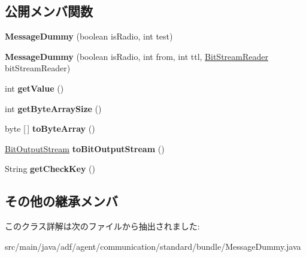 \subsection*{公開メンバ関数}
\begin{DoxyCompactItemize}
\item 
\hypertarget{classadf_1_1agent_1_1communication_1_1standard_1_1bundle_1_1MessageDummy_ab3ceef3eb4b3311da20d4b4310eb0795}{}\label{classadf_1_1agent_1_1communication_1_1standard_1_1bundle_1_1MessageDummy_ab3ceef3eb4b3311da20d4b4310eb0795} 
{\bfseries Message\+Dummy} (boolean is\+Radio, int test)
\item 
\hypertarget{classadf_1_1agent_1_1communication_1_1standard_1_1bundle_1_1MessageDummy_afdcdaae1ecf091988bd49f9b99570193}{}\label{classadf_1_1agent_1_1communication_1_1standard_1_1bundle_1_1MessageDummy_afdcdaae1ecf091988bd49f9b99570193} 
{\bfseries Message\+Dummy} (boolean is\+Radio, int from, int ttl, \hyperlink{classadf_1_1component_1_1communication_1_1util_1_1BitStreamReader}{Bit\+Stream\+Reader} bit\+Stream\+Reader)
\item 
\hypertarget{classadf_1_1agent_1_1communication_1_1standard_1_1bundle_1_1MessageDummy_a3b3a83172ac728d572969e0f8112d1ce}{}\label{classadf_1_1agent_1_1communication_1_1standard_1_1bundle_1_1MessageDummy_a3b3a83172ac728d572969e0f8112d1ce} 
int {\bfseries get\+Value} ()
\item 
\hypertarget{classadf_1_1agent_1_1communication_1_1standard_1_1bundle_1_1MessageDummy_a935b8e5e053be0d5f00a31b3d8fd97c6}{}\label{classadf_1_1agent_1_1communication_1_1standard_1_1bundle_1_1MessageDummy_a935b8e5e053be0d5f00a31b3d8fd97c6} 
int {\bfseries get\+Byte\+Array\+Size} ()
\item 
\hypertarget{classadf_1_1agent_1_1communication_1_1standard_1_1bundle_1_1MessageDummy_a5c1cdb219eeabf93a2f8e6678c845006}{}\label{classadf_1_1agent_1_1communication_1_1standard_1_1bundle_1_1MessageDummy_a5c1cdb219eeabf93a2f8e6678c845006} 
byte \mbox{[}$\,$\mbox{]} {\bfseries to\+Byte\+Array} ()
\item 
\hypertarget{classadf_1_1agent_1_1communication_1_1standard_1_1bundle_1_1MessageDummy_ab7c82662d143afd6257de8ba12cda397}{}\label{classadf_1_1agent_1_1communication_1_1standard_1_1bundle_1_1MessageDummy_ab7c82662d143afd6257de8ba12cda397} 
\hyperlink{classadf_1_1component_1_1communication_1_1util_1_1BitOutputStream}{Bit\+Output\+Stream} {\bfseries to\+Bit\+Output\+Stream} ()
\item 
\hypertarget{classadf_1_1agent_1_1communication_1_1standard_1_1bundle_1_1MessageDummy_a5042873c24b04e8a064681133dffe2ca}{}\label{classadf_1_1agent_1_1communication_1_1standard_1_1bundle_1_1MessageDummy_a5042873c24b04e8a064681133dffe2ca} 
String {\bfseries get\+Check\+Key} ()
\end{DoxyCompactItemize}
\subsection*{その他の継承メンバ}


このクラス詳解は次のファイルから抽出されました\+:\begin{DoxyCompactItemize}
\item 
src/main/java/adf/agent/communication/standard/bundle/Message\+Dummy.\+java\end{DoxyCompactItemize}

